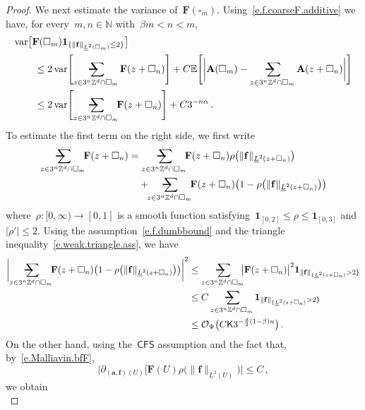 \documentclass[11pt,twoside]{article} %
\makeatletter
\let\oldsquare\square %
\renewcommand{\square}{\oldsquare}
\numberwithin{equation}{section}
\theoremstyle{definition}
\newcommand*{\N}{\ensuremath{\mathbb{N}}}
\newcommand*{\Z}{\ensuremath{\mathbb{Z}}}
\newcommand{\f}{\mathbf{f}}
\renewcommand{\a}{\mathbf{a}}
\newcommand{\cu}{\square}
\newcommand{\E}{\mathbb{E}}
\renewcommand{\O}{\mathcal{O}}
\newcommand{\indc}{\boldsymbol{1}}
\DeclareMathOperator{\var}{var}
\newcommand{\avsum}{\mathop{\mathpalette\avsuminner\relax}\displaylimits}
\newcommand\avsuminner[2]{%
  {\sbox0{$\m@th#1\sum$}%
   \vphantom{\usebox0}%
   \ooalign{%
     \hidewidth
     \smash{\,\rule[.23em]{8.8pt}{1.1pt} \relax}%
     \hidewidth\cr
   ~$\m@th#1\sum$\cr
   }%
  }%
}
\newcommand{\CFS}{\mathsf{CFS}}
\newcommand{\bfA}{\mathbf{A}}
\newcommand{\bfF}{\mathbf{F}}
\makeatother
\begin{document}
\begin{proof}
We next estimate the variance of~$\bfF(\cu_m)$. Using~\eqref{e.f.coarseF.additive} we have, for every~$m,n\in\N$ with~$\beta m < n < m$,  
\begin{align} 
\label{e.varF.cu.m.splitting}  
\lefteqn{
\var \bigl[ \bfF(\cu_m) \indc_{\{ \| \f \|_{\underline{L}^2(\cu_m)} \leq 2 \}} \bigr] 
} \qquad &
\\ 
 &
\leq
2\var \Biggl[ \avsum_{z \in 3^n \Z^d \cap \cu_m}  \bfF(z+\cu_n)  \Biggr]
+
C
\E \Biggl[ \biggl|  \bfA(\cu_m) -\avsum_{z \in 3^n \Z^d \cap \cu_m} \bfA(z+\cu_n)  \biggr| 
\Biggr]
\notag \\ & 
\leq 
2\var \Biggl[ \avsum_{z \in 3^n \Z^d \cap \cu_m} \!\!  \bfF(z+\cu_n)  \Biggr]
+
C 3^{-n\alpha} 
\,.
\end{align}
To estimate the first term on the right side, we first write
\begin{align*}
\avsum_{z \in 3^n \Z^d \cap \cu_m} \!\!  \bfF(z+\cu_n) 
& 
=
\avsum_{z \in 3^n \Z^d \cap \cu_m} \!\!  \bfF(z+\cu_n)  \rho\bigl( \| \f \|_{\underline{L}^2(z+\cu_n)} \bigr)
\\ & \quad 
+ \!\!
\avsum_{z \in 3^n \Z^d \cap \cu_m} \!\!  \bfF(z+\cu_n) \bigl( 1 -  \rho\bigl( \| \f \|_{\underline{L}^2(z+\cu_n)} \bigr) \bigr) 
\end{align*}
where~$\rho : [0,\infty) \to [0,1]$ is a smooth function satisfying~$\indc_{[0, 2]} \leq \rho \leq \indc_{[0,3]}$ and~$| \rho' | \leq 2$. 
Using the assumption~\eqref{e.f.dumbbound} and the triangle inequality~\eqref{e.weak.triangle.ass}, we have 
\begin{align}
\biggl| \avsum_{z \in 3^n \Z^d \cap \cu_m} \!\!  \bfF(z+\cu_n) \bigl( 1 -  \rho\bigl( \| \f \|_{\underline{L}^2(z+\cu_n)} \bigr) \bigr) \biggl|^2 
&
\leq 
\avsum_{z \in 3^n \Z^d \cap \cu_m} \!\!  \bigl|  \bfF(z+\cu_n)\bigr|^2 \indc_{\| \f \|_{\{ \underline{L}^2(z+\cu_n)}>2\}} 
\notag \\ & 
\leq 
C \avsum_{z \in 3^n \Z^d \cap \cu_m} \indc_{\| \f \|_{\{ \underline{L}^2(z+\cu_n)}>2\}} 
\notag \\ & 
\leq 
\O_\Psi \bigl( C \mathsf{K} 3^{-\frac d2(1-\beta)n} \bigr) \,.
\label{e.remove.bad.stuff.for.f}
\end{align}
On the other hand, using the~$\CFS$ assumption and the fact that, by~\eqref{e.Malliavin.bfF}, 
\begin{equation*}
\bigl| \partial_{(\a,\f)(U)} \bigl[ \bfF(U) \rho\bigl( \| \f \|_{\underline{L}^2(U)} \bigr)  \bigr| 
\leq 
C\,,
\end{equation*}
we obtain 
\begin{equation}

\end{equation}
\end{proof}
\end{document}
